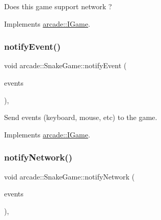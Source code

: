 Does this game support network ? 



Implements \hyperlink{classarcade_1_1_i_game_ae66bf253e252f43ce17d9e94f08a1d1c}{arcade\+::\+I\+Game}.

\mbox{\label{classarcade_1_1_snake_game_a93016697def74ebd53a76e33fbb0e583}} 
\subsubsection{\texorpdfstring{notify\+Event()}{notifyEvent()}}
{\footnotesize\ttfamily void arcade\+::\+Snake\+Game\+::notify\+Event (\begin{DoxyParamCaption}\item[{std\+::vector$<$ \hyperlink{structarcade_1_1_event}{Event} $>$ \&\&}]{events }\end{DoxyParamCaption})\hspace{0.3cm}{\ttfamily [override]}, {\ttfamily [virtual]}}



Send events (keyboard, mouse, etc) to the game. 



Implements \hyperlink{classarcade_1_1_i_game_a37d164b4052fa3c28256fb0bf0002876}{arcade\+::\+I\+Game}.

\mbox{\label{classarcade_1_1_snake_game_a8b4a36ff6ce940d86894433e88bb50f5}} 
\subsubsection{\texorpdfstring{notify\+Network()}{notifyNetwork()}}
{\footnotesize\ttfamily void arcade\+::\+Snake\+Game\+::notify\+Network (\begin{DoxyParamCaption}\item[{std\+::vector$<$ \hyperlink{structarcade_1_1_network_packet}{Network\+Packet} $>$ \&\&}]{events }\end{DoxyParamCaption})\hspace{0.3cm}{\ttfamily [override]}, {\ttfamily [virtual]}}



